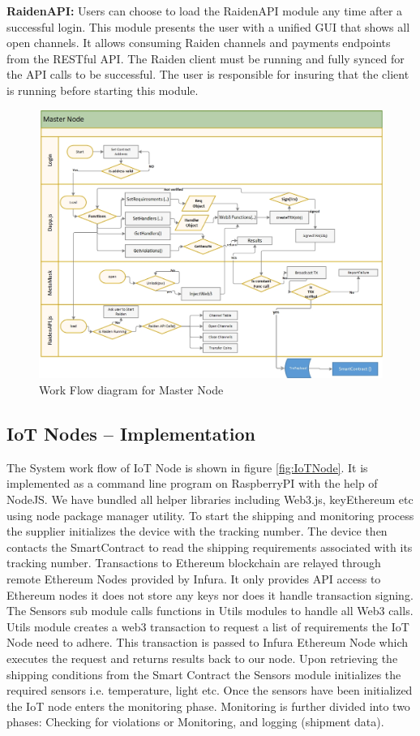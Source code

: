 \textbf{RaidenAPI:}
Users can choose to load the RaidenAPI module any time after a successful login. This module presents the user with a unified GUI that shows all open channels. It allows consuming Raiden channels and payments endpoints from the RESTful API. The Raiden client must be running and fully synced for the API calls to be successful. The user is responsible for insuring that the client is running before starting this module. 
\begin{figure}[h]
	\centering
    \includegraphics[width=160mm,scale=1]{figs/master-workflow}
	\caption{Work Flow diagram for Master Node}
	\label{fig:master-workflow} 
\end{figure}

\subsection{IoT Nodes – Implementation} \label{IoT-Nodes} 
The System work flow of IoT Node is shown in figure \ref{fig:IoTNode}. It is implemented as a command line program on RaspberryPI with the help of NodeJS. We have bundled all helper libraries including Web3.js, keyEthereum etc using node package manager utility. To start the shipping and monitoring process the supplier initializes the device with the tracking number. The device then contacts the SmartContract to read the shipping requirements associated with its tracking number. Transactions to Ethereum blockchain are relayed through remote Ethereum Nodes provided by Infura. It only provides API access to Ethereum nodes it does not store any keys nor does it handle transaction signing. The Sensors sub module calls functions in Utils modules to handle all Web3 calls. Utils module creates a web3 transaction to request a list of requirements the IoT Node need to adhere. This transaction is passed to Infura Ethereum Node which executes the request and returns results back to our node. Upon retrieving the shipping conditions from the Smart Contract the Sensors module initializes the required sensors i.e. temperature, light etc. Once the sensors have been initialized the IoT node enters the monitoring phase.  Monitoring is further divided into two phases: Checking for violations or Monitoring, and logging (shipment data).

